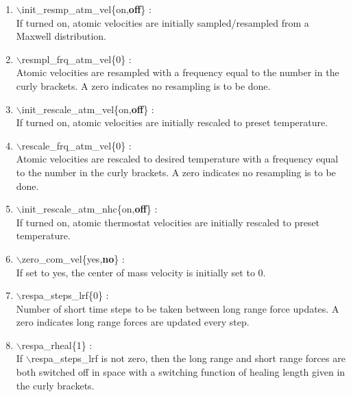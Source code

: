 \documentclass[12pt,titlepage]{article}
\begin{document}
\begin{enumerate}
 \vspace{0.15in}
 \item   $\backslash$init\_resmp\_atm\_vel\{on,{\bf off}\} : \\
     If turned on, atomic velocities are initially sampled/resampled from a 
     Maxwell distribution.


 \vspace{0.15in}
 \item   $\backslash$resmpl\_frq\_atm\_vel\{0\} : \\
     Atomic velocities are resampled with a frequency equal to the number 
     in the curly brackets.  A zero indicates no resampling is to be done.


 \vspace{0.15in}
 \item   $\backslash$init\_rescale\_atm\_vel\{on,{\bf off}\} : \\
    If turned on, atomic velocities are initially rescaled to preset 
    temperature.

 \vspace{0.15in}
 \item   $\backslash$rescale\_frq\_atm\_vel\{0\} : \\
    Atomic velocities are rescaled to desired temperature
    with a frequency equal to the number in the
    curly brackets.  A zero indicates no resampling is to be done.

 \vspace{0.15in} 
 \item   $\backslash$init\_rescale\_atm\_nhc\{on,{\bf off}\} : \\
    If turned on, atomic thermostat velocities are initially rescaled to 
    preset temperature.

 \vspace{0.15in} 
 \item   $\backslash$zero\_com\_vel\{yes,{\bf no}\} : \\
    If set to yes, the center of mass velocity is initially set to 0.

 \vspace{0.15in} 
 \item   $\backslash$respa\_steps\_lrf\{0\} : \\
    Number of short time steps to be taken between long range force updates.
    A zero indicates long range forces are updated every step.

 \vspace{0.15in} 
 \item   $\backslash$respa\_rheal\{1\} : \\
    If $\backslash$respa\_steps\_lrf is not zero, then the long range 
    and short range forces are both switched off in space with a switching
    function of healing length given in the curly brackets.


\end{enumerate}
\end{document}
